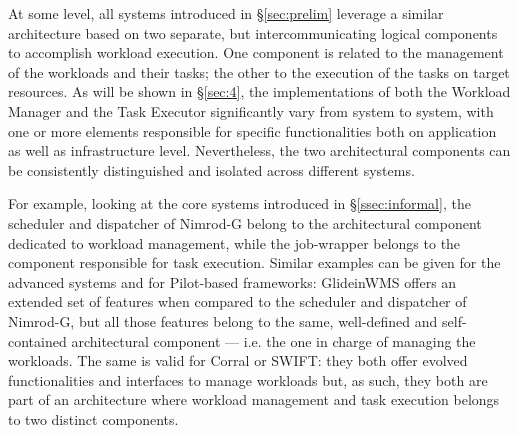 \documentclass{sig-alternate}
\begin{document}

%

At some level, all \pilotjob systems introduced in \S\ref{sec:prelim}
leverage a similar architecture based on two separate, but
intercommunicating logical components to accomplish workload
execution. One component is related to the management of the workloads
and their tasks; the other to the execution of the tasks on target
resources. As will be shown in \S\ref{sec:4}, the implementations of
both the Workload Manager and the Task Executor significantly vary
from system to system, with one or more elements responsible for
specific functionalities both on application as well as infrastructure
level. Nevertheless, the two architectural components can be
consistently distinguished and isolated across different \pilotjob
systems.

For example, looking at the core \pilotjob systems introduced in
\S\ref{ssec:informal}, the scheduler and dispatcher of Nimrod-G belong
to the architectural component dedicated to workload management, while
the job-wrapper belongs to the component responsible for task
execution. Similar examples can be given for the advanced \pilotjob
systems and for Pilot-based frameworks: GlideinWMS offers an extended
set of features when compared to the scheduler and dispatcher of
Nimrod-G, but all those features belong to the same, well-defined and
self-contained architectural component --- i.e. the one in charge of
managing the workloads. The same is valid for Corral or SWIFT: they
both offer evolved functionalities and interfaces to manage workloads
but, as such, they both are part of an architecture where workload
management and task execution belongs to two distinct components.
\end{document}
